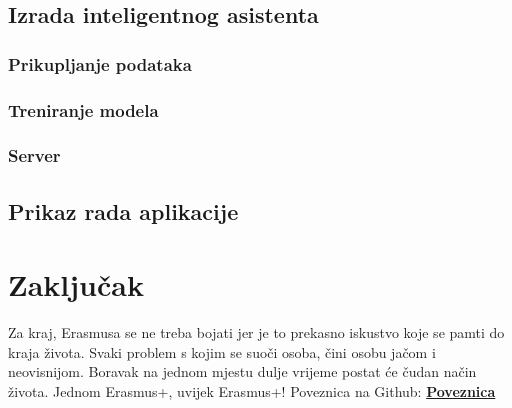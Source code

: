 \documentclass[]{foi}
\begin{document}
\section{Izrada inteligentnog asistenta}

\subsection{Prikupljanje podataka}
\subsection{Treniranje modela}
\subsection{Server}
\section{Prikaz rada aplikacije}




\chapter{Zaključak}



Za kraj, Erasmusa se ne treba bojati jer je to prekasno iskustvo koje se pamti do kraja života. Svaki problem s kojim se suoči osoba, čini osobu jačom i neovisnijom. 
Boravak na jednom mjestu dulje vrijeme postat će čudan način života. Jednom Erasmus+, uvijek Erasmus+!
Poveznica na Github: \href{https://github.com/ababic20/Website-with-a-chatbot.git}{\textbf{Poveznica}} 

\makebackmatter
\end{document}
